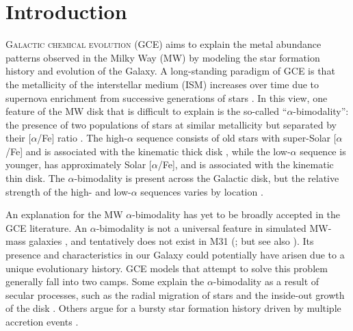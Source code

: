\documentclass[twocolumn,twocolappendix,linenumbers]{aastex631}
\newcommand{\aFe}{[$\alpha$/Fe]\xspace}
\begin{document}
\section{Introduction}
\label{sec:introduction}

\lettrine{G}{alactic chemical evolution} (GCE) aims to explain the metal abundance patterns observed in the Milky Way (MW) by modeling the star formation history and evolution of the Galaxy. A long-standing paradigm of GCE is that the metallicity of the interstellar medium (ISM) increases over time due to supernova enrichment from successive generations of stars \citep[e.g.,][]{tinsley_stellar_1979,matteucci_relative_1986}. In this view, one feature of the MW disk that is difficult to explain is the so-called ``$\alpha$-bimodality'': the presence of two populations of stars at similar metallicity but separated by their \aFe ratio \citep[e.g.,][]{bensby_exploring_2014}. The high-$\alpha$ sequence consists of old stars \citep[$\gtrsim9$ Gyr; e.g.,][]{pinsonneault_apokasc-3_2025} with super-Solar \aFe and is associated with the kinematic thick disk \citep[e.g.,][]{fuhrmann_nearby_1998}, while the low-$\alpha$ sequence is younger, has approximately Solar \aFe, and is associated with the kinematic thin disk. The $\alpha$-bimodality is present across the Galactic disk, but the relative strength of the high- and low-$\alpha$ sequences varies by location \citep{hayden_chemical_2015}. 

An explanation for the MW $\alpha$-bimodality has yet to be broadly accepted in the GCE literature. An $\alpha$-bimodality is not a universal feature in simulated MW-mass galaxies \citep[e.g.,][]{mackereth_origin_2018,parul_effect_2025}, and tentatively does not exist in M31 (\citealt{nidever_prevalence_2024}; but see also \citealt{kobayashi_fe_2023}). Its presence and characteristics in our Galaxy could potentially have arisen due to a unique evolutionary history. GCE models that attempt to solve this problem generally fall into two camps. Some explain the $\alpha$-bimodality as a result of secular processes, such as the radial migration of stars and the inside-out growth of the disk \citep[e.g.,][]{schonrich_chemical_2009,kubryk_evolution_2015,sharma_chemical_2021,chen_chemical_2023,prantzos_origin_2023}. Others argue for a bursty star formation history driven by multiple accretion events \citep[e.g.,][]{chiappini_chemical_1997,mackereth_origin_2018,spitoni_beyond_2023}.
\end{document}
